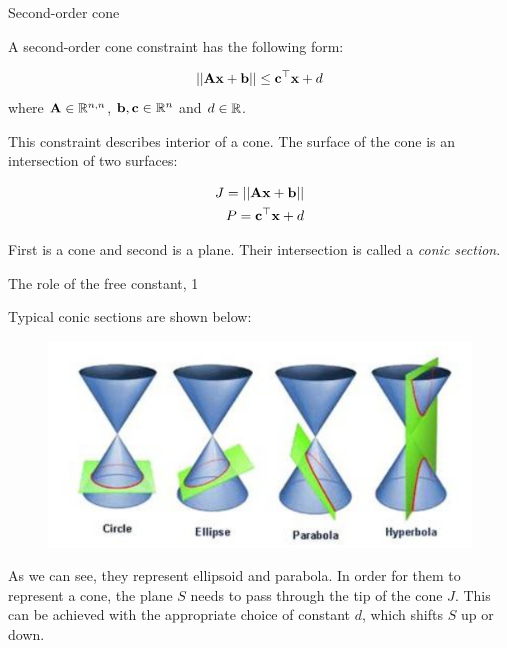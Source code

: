 \documentclass{beamer}
\begin{document}
\begin{frame}{Second-order cone}
	\begin{flushleft}
		
		A second-order cone constraint has the following form:
		
		\begin{equation}
			||\mathbf{A}\mathbf{x}+\mathbf{b}|| \leq \mathbf{c}^\top \mathbf{x} + d
		\end{equation}
		where $\mathbf{A} \in \mathbb{R}^{n, n}$, $\mathbf{b}, \mathbf{c} \in \mathbb{R}^{n}$ and $d \in \mathbb{R}$.
		
		\bigskip
		
		This constraint describes interior of a cone. The surface of the cone is an intersection of two surfaces: 
		
		\begin{align}
			J = ||\mathbf{A}\mathbf{x}+\mathbf{b}|| \\
			P = \mathbf{c}^\top \mathbf{x} + d
		\end{align}
		
		First is a cone and second is a plane. Their intersection is called a \emph{conic section}. 
		
		
	\end{flushleft}
\end{frame}






\begin{frame}{The role of the free constant, 1}
	\begin{flushleft}
		
		Typical conic sections are shown below:
		
		\begin{figure}
			\centering
			\includegraphics[width=0.7\linewidth]{cones}
			\label{fig:cones}
		\end{figure}
		
		As we can see, they represent ellipsoid and parabola. In order for them to represent a cone, the plane  $S$ needs to pass through the tip of the cone $J$. This can be achieved with the appropriate choice of constant $d$, which shifts $S$ up or down.
		
	\end{flushleft}
\end{frame}
\end{document}
